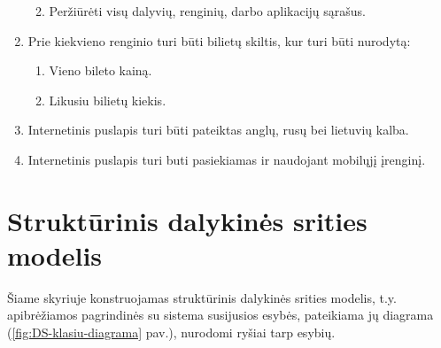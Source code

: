 \documentclass{VUMIFPSkursinis}
\begin{document}
\begin{enumerate}[label=\textbf{FR\arabic*}]
\begin{enumerate}[label*=\textbf{.\arabic*}]
\begin{enumerate}[label*=\textbf{.\arabic*}]
						    \end{enumerate}
						\item Peržiūrėti visų dalyvių, renginių, darbo aplikacijų sąrašus.
					\end{enumerate}
			    \item Prie kiekvieno renginio turi būti bilietų skiltis, kur turi būti nurodytą:
					\begin{enumerate}[label*=\textbf{.\arabic*}]
						\item Vieno bileto kainą.
						\item Likusiu bilietų kiekis.
					\end{enumerate}
				\item Internetinis puslapis turi būti pateiktas anglų, rusų bei lietuvių kalba.
				\item  Internetinis puslapis turi buti pasiekiamas ir naudojant mobilųjį įrenginį.
			\end{enumerate}

    \section{Struktūrinis dalykinės srities modelis} \label{strukturinisDSModelis}
		Šiame skyriuje konstruojamas struktūrinis dalykinės srities modelis, t.y. apibrėžiamos pagrindinės su sistema susijusios esybės, pateikiama jų diagrama (\ref{fig:DS-klasiu-diagrama} pav.), nurodomi ryšiai tarp esybių.
\end{document}
